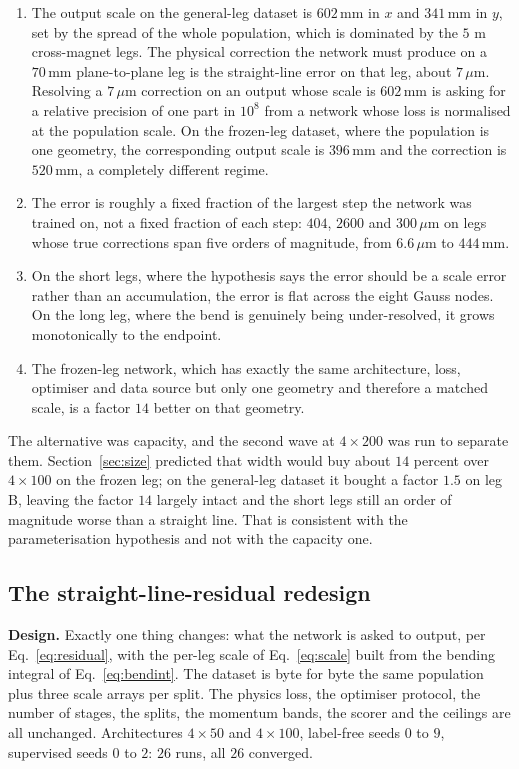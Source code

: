 \documentclass[11pt,a4paper]{article}
\newcommand{\um}{\ensuremath{\,\mu\mathrm{m}}}
\newcommand{\mm}{\ensuremath{\,\mathrm{mm}}}
\begin{document}
\begin{enumerate}
  \item The output scale on the general-leg dataset is $602\mm$ in $x$ and
  $341\mm$ in $y$, set by the spread of the whole population, which is dominated
  by the $5$ m cross-magnet legs. The physical correction the network must
  produce on a $70\mm$ plane-to-plane leg is the straight-line error on that
  leg, about $7\um$. Resolving a $7\um$ correction on an output whose scale is
  $602\mm$ is asking for a relative precision of one part in $10^{8}$ from a
  network whose loss is normalised at the population scale. On the frozen-leg
  dataset, where the population is one geometry, the corresponding output scale
  is $396\mm$ and the correction is $520\mm$, a completely different regime.
  \item The error is roughly a fixed fraction of the largest step the network
  was trained on, not a fixed fraction of each step: $404$, $2600$ and $300\um$
  on legs whose true corrections span five orders of magnitude, from $6.6\um$ to
  $444\mm$.
  \item On the short legs, where the hypothesis says the error should be a scale
  error rather than an accumulation, the error is flat across the eight Gauss
  nodes. On the long leg, where the bend is genuinely being under-resolved, it
  grows monotonically to the endpoint.
  \item The frozen-leg network, which has exactly the same architecture, loss,
  optimiser and data source but only one geometry and therefore a matched scale,
  is a factor $14$ better on that geometry.
\end{enumerate}

The alternative was capacity, and the second wave at $4 \times 200$ was run to
separate them. Section~\ref{sec:size} predicted that width would buy about $14$
percent over $4 \times 100$ on the frozen leg; on the general-leg dataset it
bought a factor $1.5$ on leg B, leaving the factor $14$ largely intact and the
short legs still an order of magnitude worse than a straight line. That is
consistent with the parameterisation hypothesis and not with the capacity one.

\subsection{The straight-line-residual redesign}
\label{sec:residual}

\textbf{Design.} Exactly one thing changes: what the network is asked to output,
per Eq.~\eqref{eq:residual}, with the per-leg scale of Eq.~\eqref{eq:scale}
built from the bending integral of Eq.~\eqref{eq:bendint}. The dataset is byte
for byte the same population plus three scale arrays per split. The physics
loss, the optimiser protocol, the number of stages, the splits, the momentum
bands, the scorer and the ceilings are all unchanged. Architectures
$4 \times 50$ and $4 \times 100$, label-free seeds $0$ to $9$, supervised seeds
$0$ to $2$: $26$ runs, all $26$ converged.
\end{document}
